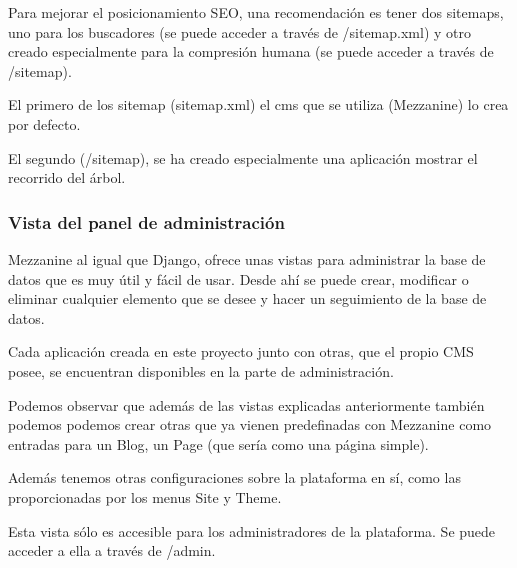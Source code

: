 Para mejorar el posicionamiento SEO, una recomendación es  tener dos sitemaps, uno para los buscadores (se puede acceder a través de /sitemap.xml) y otro creado especialmente para la compresión humana (se puede acceder a través de /sitemap).


El primero de los sitemap (sitemap.xml) el cms que se utiliza (Mezzanine) lo crea por defecto.


El segundo (/sitemap), se ha creado especialmente una aplicación mostrar el recorrido del árbol.


\subsubsection{Vista del panel de administración}
\label{subsubsec:admin}


Mezzanine al igual que Django, ofrece unas vistas para administrar la base de datos que es muy útil y fácil de usar. Desde ahí se puede crear, modificar o eliminar cualquier elemento que se desee y hacer un seguimiento de la base de datos. 


Cada aplicación creada en este proyecto junto con otras, que el propio CMS posee, se encuentran disponibles en la parte de administración.  


Podemos observar que además de las vistas explicadas anteriormente también podemos podemos crear otras que ya vienen predefinadas con Mezzanine como entradas para un Blog, un Page (que sería como una página simple).


Además tenemos otras configuraciones sobre la plataforma en sí, como las proporcionadas por los menus Site y Theme.


Esta vista sólo es accesible para los administradores de la plataforma. Se puede acceder a ella a través de /admin.
